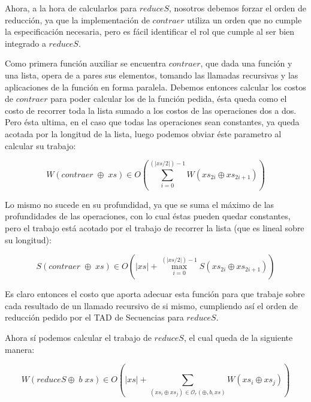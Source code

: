 \documentclass[a4paper,10pt]{article}
\begin{document}
    Ahora, a la hora de calcularlos para $reduceS$, nosotros debemos forzar
el orden de reducción, ya que la implementación de $contraer$ utiliza un orden
que no cumple la especificación necesaria, pero es fácil identificar el rol que
cumple al ser bien integrado a $reduceS$.

    Como primera función auxiliar se encuentra $contraer$, que dada una función y
una lista, opera de a pares sus elementos, tomando las llamadas recursivas y las 
aplicaciones de la función en forma paralela. Debemos entonces calcular los costos
de $contraer$ para poder calcular los de la función pedida, ésta queda como el costo
de recorrer toda la lista sumado a los costos de las operaciones dos a dos. Pero ésta
ultima, en el caso que todas las operaciones sean constantes, ya queda acotada por la
longitud de la lista, luego podemos obviar éste parametro al calcular su trabajo:

\begin{equation*}
    W \left( contraer \;\oplus \;xs \right) \in
    O \left( \sum_{i=0}^{(\vert xs / 2 \vert) - 1} W \left( xs_{2i} \oplus xs_{2i+1} \right) \right)
\end{equation*}

    Lo mismo no sucede en su profundidad, ya que se suma el máximo de las profundidades
de las operaciones, con lo cual éstas pueden quedar constantes, pero el trabajo está 
acotado por el trabajo de recorrer la lista (que es lineal sobre su longitud):

\begin{equation*}
    S \left( contraer \;\oplus \;xs \right) \in
    O \left( \vert xs \vert + \max_{i=0}^{(\vert xs / 2 \vert) - 1} S \left( xs_{2i} \oplus xs_{2i+1} \right) \right)
\end{equation*}

\smallskip

    Es claro entonces el costo que aporta adecuar esta función para que trabaje sobre
cada resultado de un llamado recursivo de si mismo, cumpliendo así el orden de
reducción pedido por el TAD de Secuencias para $reduceS$.

    Ahora sí podemos calcular el trabajo de $reduceS$, el cual queda de la siguiente
manera: 

\begin{equation*}
    W \left( reduceS \oplus \; b \; xs \right) \in
    O \left( \vert xs \vert + \sum_{(xs_i \oplus xs_j) \in \mathcal{O}_r(\oplus,b,xs)} W \left( xs_i \oplus xs_j \right) \right)
\end{equation*}
\end{document}
